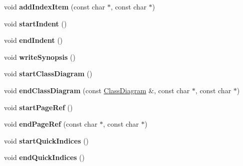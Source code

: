 \begin{DoxyCompactItemize}
\item 
\hypertarget{class_latex_generator_a6a680849ac320b2cbb670773aa5c9feb}{void {\bfseries add\-Index\-Item} (const char $\ast$, const char $\ast$)}\label{class_latex_generator_a6a680849ac320b2cbb670773aa5c9feb}

\item 
\hypertarget{class_latex_generator_a34fb23b9705fd9c97bfb8730b5667822}{void {\bfseries start\-Indent} ()}\label{class_latex_generator_a34fb23b9705fd9c97bfb8730b5667822}

\item 
\hypertarget{class_latex_generator_a3e925c49464a35005365e14899e6c0a8}{void {\bfseries end\-Indent} ()}\label{class_latex_generator_a3e925c49464a35005365e14899e6c0a8}

\item 
\hypertarget{class_latex_generator_acba0caaf7ea5f4acb9b4bf3ccbf2ee68}{void {\bfseries write\-Synopsis} ()}\label{class_latex_generator_acba0caaf7ea5f4acb9b4bf3ccbf2ee68}

\item 
\hypertarget{class_latex_generator_ab9f199144725218464219039e2e7284e}{void {\bfseries start\-Class\-Diagram} ()}\label{class_latex_generator_ab9f199144725218464219039e2e7284e}

\item 
\hypertarget{class_latex_generator_a723ed80335c8a31791b12302cf6f9cc5}{void {\bfseries end\-Class\-Diagram} (const \hyperlink{class_class_diagram}{Class\-Diagram} \&, const char $\ast$, const char $\ast$)}\label{class_latex_generator_a723ed80335c8a31791b12302cf6f9cc5}

\item 
\hypertarget{class_latex_generator_acb1f8019fc7ab54bdba19c92ef4a223d}{void {\bfseries start\-Page\-Ref} ()}\label{class_latex_generator_acb1f8019fc7ab54bdba19c92ef4a223d}

\item 
\hypertarget{class_latex_generator_a0e845e76703cf2a22b8c801febfe14c8}{void {\bfseries end\-Page\-Ref} (const char $\ast$, const char $\ast$)}\label{class_latex_generator_a0e845e76703cf2a22b8c801febfe14c8}

\item 
\hypertarget{class_latex_generator_a1003d38afed51e3e932a61be3b2d71a4}{void {\bfseries start\-Quick\-Indices} ()}\label{class_latex_generator_a1003d38afed51e3e932a61be3b2d71a4}

\item 
\hypertarget{class_latex_generator_a8ccfa7b4cc697673db66d95470901da6}{void {\bfseries end\-Quick\-Indices} ()}\label{class_latex_generator_a8ccfa7b4cc697673db66d95470901da6}


\end{DoxyCompactItemize}

